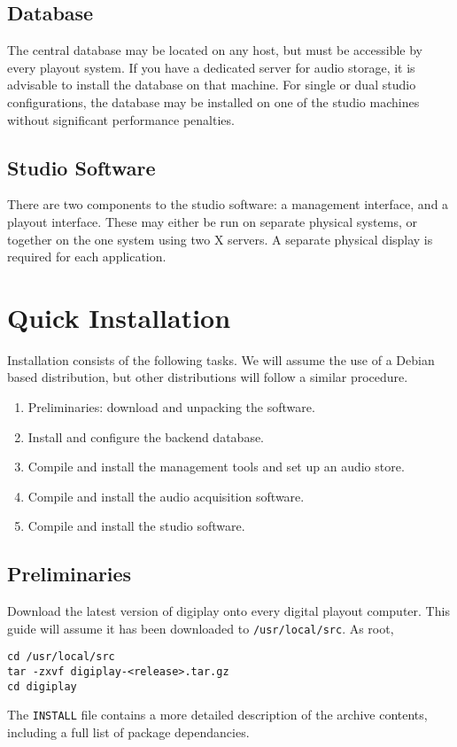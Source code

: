 \documentclass[a4paper,12pt]{report}
\numberwithin{equation}{section}
\begin{document}
\section{Database}
The central database may be located on any host, but must be accessible by every playout system. If you have a dedicated server for audio storage, it is advisable to install the database on that machine. For single or dual studio configurations, the database may be installed on one of the studio machines without significant performance penalties.

\section{Studio Software}
There are two components to the studio software: a management interface, and a playout interface. These may either be run on separate physical systems, or together on the one system using two X servers. A separate physical display is required for each application.

\chapter{Quick Installation}
Installation consists of the following tasks. We will assume the use of a Debian based distribution, but other distributions will follow a similar procedure.
\begin{enumerate}
\item Preliminaries: download and unpacking the software.
\item Install and configure the backend database.
\item Compile and install the management tools and set up an audio store.
\item Compile and install the audio acquisition software.
\item Compile and install the studio software.
\end{enumerate}

\section{Preliminaries}
Download the latest version of digiplay onto every digital playout computer. This guide will assume it has been downloaded to \texttt{/usr/local/src}. As root,
\begin{lstlisting}
cd /usr/local/src
tar -zxvf digiplay-<release>.tar.gz
cd digiplay
\end{lstlisting}
The \texttt{INSTALL} file contains a more detailed description of the archive contents, including a full list of package dependancies.
\end{document}
